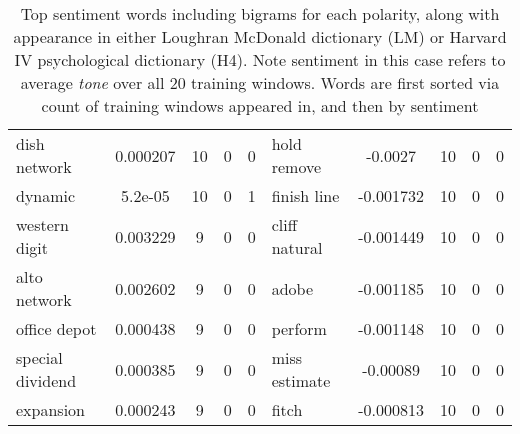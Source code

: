 \documentclass[ oneside,%
                    author={Joshua Felmeden},
                    degree={MEng},
                     title={Sentiment Analysis of Financial Headlines Based on Stock Returns},
                  subtitle={Research}]{dissertation}
\begin{document}
\begin{table}[!ht]
\begin{tabular}{lcccclcccc}
dish network & 0.000207 & 10 & 0 & 0 & hold remove & -0.0027 & 10 & 0 & 0 \\
dynamic & 5.2e-05 & 10 & 0 & 1 & finish line & -0.001732 & 10 & 0 & 0 \\
western digit & 0.003229 & 9 & 0 & 0 & cliff natural & -0.001449 & 10 & 0 & 0 \\
alto network & 0.002602 & 9 & 0 & 0 & adobe & -0.001185 & 10 & 0 & 0 \\
office depot & 0.000438 & 9 & 0 & 0 & perform & -0.001148 & 10 & 0 & 0 \\
special dividend & 0.000385 & 9 & 0 & 0 & miss estimate & -0.00089 & 10 & 0 & 0 \\
expansion & 0.000243 & 9 & 0 & 0 & fitch & -0.000813 & 10 & 0 & 0 \\
\bottomrule
\end{tabular}
\caption[Sentiment word list for bigrams]{Top sentiment words including bigrams for each polarity, along with appearance in either Loughran McDonald dictionary (LM) or Harvard IV psychological dictionary (H4). Note sentiment in this case refers to average \textit{tone} over all 20 training windows. Words are first sorted via count of training windows appeared in, and then by sentiment}
\end{table}
\end{document}
